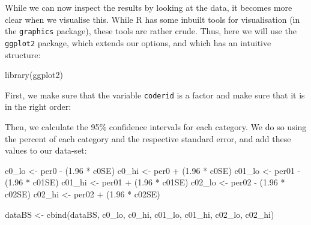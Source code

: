 \documentclass[
]{book}
\newenvironment{Shaded}{\begin{snugshade}}{\end{snugshade}}
\newcommand{\DecValTok}[1]{\textcolor[rgb]{0.00,0.00,0.81}{#1}}
\newcommand{\FloatTok}[1]{\textcolor[rgb]{0.00,0.00,0.81}{#1}}
\newcommand{\FunctionTok}[1]{\textcolor[rgb]{0.00,0.00,0.00}{#1}}
\newcommand{\NormalTok}[1]{#1}
\newcommand{\OtherTok}[1]{\textcolor[rgb]{0.56,0.35,0.01}{#1}}
\newcommand{\SpecialCharTok}[1]{\textcolor[rgb]{0.00,0.00,0.00}{#1}}
\begin{document}
While we can now inspect the results by looking at the data, it becomes more clear when we visualise this. While R has some inbuilt tools for visualisation (in the \texttt{graphics} package), these tools are rather crude. Thus, here we will use the \texttt{ggplot2} package, which extends our options, and which has an intuitive structure:

\begin{Shaded}
\begin{Highlighting}[]
\FunctionTok{library}\NormalTok{(ggplot2)}
\end{Highlighting}
\end{Shaded}

First, we make sure that the variable \texttt{coderid} is a factor and make sure that it is in the right order:

\begin{Shaded}
\end{Shaded}

Then, we calculate the 95\% confidence intervals for each category. We do so using the percent of each category and the respective standard error, and add these values to our data-set:

\begin{Shaded}
\begin{Highlighting}[]
\NormalTok{c0\_lo }\OtherTok{\textless{}{-}}\NormalTok{ per0 }\SpecialCharTok{{-}}\NormalTok{ (}\FloatTok{1.96} \SpecialCharTok{*}\NormalTok{ c0SE)}
\NormalTok{c0\_hi }\OtherTok{\textless{}{-}}\NormalTok{ per0 }\SpecialCharTok{+}\NormalTok{ (}\FloatTok{1.96} \SpecialCharTok{*}\NormalTok{ c0SE)}
\NormalTok{c01\_lo }\OtherTok{\textless{}{-}}\NormalTok{ per01 }\SpecialCharTok{{-}}\NormalTok{ (}\FloatTok{1.96} \SpecialCharTok{*}\NormalTok{ c01SE)}
\NormalTok{c01\_hi }\OtherTok{\textless{}{-}}\NormalTok{ per01 }\SpecialCharTok{+}\NormalTok{ (}\FloatTok{1.96} \SpecialCharTok{*}\NormalTok{ c01SE)}
\NormalTok{c02\_lo }\OtherTok{\textless{}{-}}\NormalTok{ per02 }\SpecialCharTok{{-}}\NormalTok{ (}\FloatTok{1.96} \SpecialCharTok{*}\NormalTok{ c02SE)}
\NormalTok{c02\_hi }\OtherTok{\textless{}{-}}\NormalTok{ per02 }\SpecialCharTok{+}\NormalTok{ (}\FloatTok{1.96} \SpecialCharTok{*}\NormalTok{ c02SE)}

\NormalTok{dataBS }\OtherTok{\textless{}{-}} \FunctionTok{cbind}\NormalTok{(dataBS, c0\_lo, c0\_hi, c01\_lo, c01\_hi, c02\_lo,}
\NormalTok{    c02\_hi)}
\end{Highlighting}
\end{Shaded}
\end{document}
